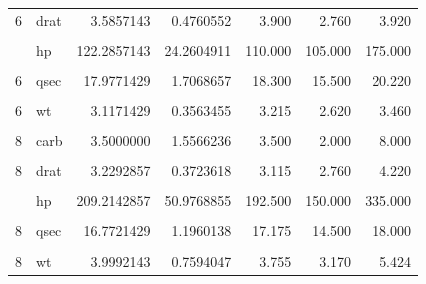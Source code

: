 \begin{table}[!h]
\begin{tabular}{rlrrrrr}
6 & drat & 3.5857143 & 0.4760552 & 3.900 & 2.760 & 3.920\\
\cellcolor{gray!10}{6} & \cellcolor{gray!10}{gear} & \cellcolor{gray!10}{3.8571429} & \cellcolor{gray!10}{0.6900656} & \cellcolor{gray!10}{4.000} & \cellcolor{gray!10}{3.000} & \cellcolor{gray!10}{5.000}\\
\addlinespace
6 & hp & 122.2857143 & 24.2604911 & 110.000 & 105.000 & 175.000\\
\cellcolor{gray!10}{6} & \cellcolor{gray!10}{mpg} & \cellcolor{gray!10}{19.7428571} & \cellcolor{gray!10}{1.4535670} & \cellcolor{gray!10}{19.700} & \cellcolor{gray!10}{17.800} & \cellcolor{gray!10}{21.400}\\
6 & qsec & 17.9771429 & 1.7068657 & 18.300 & 15.500 & 20.220\\
\cellcolor{gray!10}{6} & \cellcolor{gray!10}{vs} & \cellcolor{gray!10}{0.5714286} & \cellcolor{gray!10}{0.5345225} & \cellcolor{gray!10}{1.000} & \cellcolor{gray!10}{0.000} & \cellcolor{gray!10}{1.000}\\
6 & wt & 3.1171429 & 0.3563455 & 3.215 & 2.620 & 3.460\\
\addlinespace
\cellcolor{gray!10}{8} & \cellcolor{gray!10}{am} & \cellcolor{gray!10}{0.1428571} & \cellcolor{gray!10}{0.3631365} & \cellcolor{gray!10}{0.000} & \cellcolor{gray!10}{0.000} & \cellcolor{gray!10}{1.000}\\
8 & carb & 3.5000000 & 1.5566236 & 3.500 & 2.000 & 8.000\\
\cellcolor{gray!10}{8} & \cellcolor{gray!10}{disp} & \cellcolor{gray!10}{353.1000000} & \cellcolor{gray!10}{67.7713236} & \cellcolor{gray!10}{350.500} & \cellcolor{gray!10}{275.800} & \cellcolor{gray!10}{472.000}\\
8 & drat & 3.2292857 & 0.3723618 & 3.115 & 2.760 & 4.220\\
\cellcolor{gray!10}{8} & \cellcolor{gray!10}{gear} & \cellcolor{gray!10}{3.2857143} & \cellcolor{gray!10}{0.7262730} & \cellcolor{gray!10}{3.000} & \cellcolor{gray!10}{3.000} & \cellcolor{gray!10}{5.000}\\
\addlinespace
8 & hp & 209.2142857 & 50.9768855 & 192.500 & 150.000 & 335.000\\
\cellcolor{gray!10}{8} & \cellcolor{gray!10}{mpg} & \cellcolor{gray!10}{15.1000000} & \cellcolor{gray!10}{2.5600481} & \cellcolor{gray!10}{15.200} & \cellcolor{gray!10}{10.400} & \cellcolor{gray!10}{19.200}\\
8 & qsec & 16.7721429 & 1.1960138 & 17.175 & 14.500 & 18.000\\
\cellcolor{gray!10}{8} & \cellcolor{gray!10}{vs} & \cellcolor{gray!10}{0.0000000} & \cellcolor{gray!10}{0.0000000} & \cellcolor{gray!10}{0.000} & \cellcolor{gray!10}{0.000} & \cellcolor{gray!10}{0.000}\\
8 & wt & 3.9992143 & 0.7594047 & 3.755 & 3.170 & 5.424\\
\bottomrule
\end{tabular}
\end{table}
